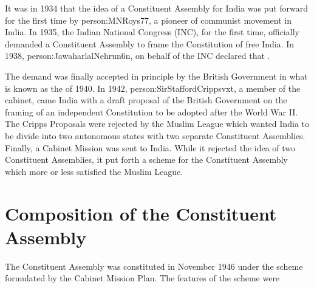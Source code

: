 It was in 1934 that the idea of a Constituent Assembly for India was put forward for the first time by \gls{person:MNRoys77}, a pioneer of communist movement in India. In 1935, the Indian National Congress (INC), for the first time, officially demanded a Constituent Assembly to frame the Constitution of free India. In 1938, \gls{person:JawaharlalNehrun6n}, on behalf of the INC declared that .

The demand was finally accepted in principle by the British Government in what is known as the  of 1940. In 1942, \gls{person:SirStaffordCrippsvxt}, a member of the cabinet, came India with a draft proposal of the British Government on the framing of an independent Constitution to be adopted after the World War II. The Cripps Proposals were rejected by the Muslim League which wanted India to be divide into two autonomous states with two separate Constituent Assemblies. Finally, a Cabinet Mission was sent to India. While it rejected the idea of two Constituent Assemblies, it put forth a scheme for the Constituent Assembly which more or less satisfied the Muslim League.

\section{Composition of the Constituent Assembly}

The Constituent Assembly was constituted in November 1946 under the scheme formulated by the Cabinet Mission Plan. The features of the scheme were

